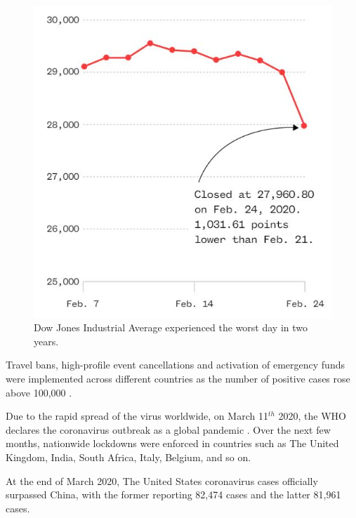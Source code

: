 \begin{figure}[th]
\centering
\includegraphics{Images/stockMarket.JPG}
\decoRule
\caption[Dow Jones]{Dow Jones Industrial Average experienced the worst day in two years. \cite{WBY2020}}
\label{fig:Dow Jones}
\end{figure}

Travel bans, high-profile event cancellations and activation of emergency funds were 
implemented across different countries as the number of positive cases rose above 100,000 \cite{SHA2020}.

Due to the rapid spread of the virus worldwide, on March 11$^{th}$ 2020, the WHO declares the coronavirus 
outbreak as a global pandemic \cite{JAS2020}. Over the next few months, nationwide 
lockdowns were enforced in countries such as The United Kingdom, India, South Africa, Italy, Belgium, and so on.

At the end of March 2020, The United States coronavirus cases officially surpassed China, with the former 
reporting 82,474 cases and the latter 81,961 cases.

